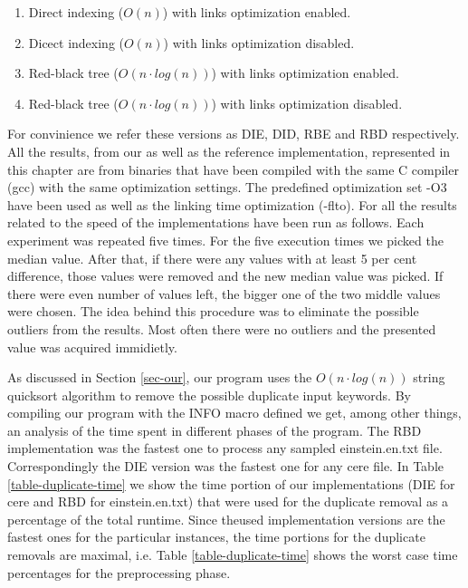 \documentclass[english,twoside,censored,csm,algorithms-track-2020]{HYthesisML}
\theoremstyle{plain}
\theoremstyle{definition}
\begin{document}
\begin{enumerate}
\item Direct indexing ($O(n)$) with links optimization enabled.
\item Dicect indexing ($O(n)$) with links optimization disabled.
\item Red-black tree ($O(n\cdot log(n))$) with links optimization enabled.
\item Red-black tree ($O(n\cdot log(n))$) with links optimization disabled.
\end{enumerate}

For convinience we refer these versions as DIE, DID, RBE and RBD respectively. All the results,
from our as well as the reference implementation,
represented in this chapter are from binaries that have been compiled with the same C
compiler (gcc) with the same optimization settings. The predefined optimization set -O3 have
been used as well as the linking time optimization (-flto). For all the results related to the
speed of the implementations have been run as follows. Each experiment was repeated five times. For
the five execution times we picked the median value. After that, if there were any values with 
at least 5 per cent difference, those values were removed and the new median value was picked.
If there were even number of values left, the bigger one of the two middle values were chosen.
The idea behind this procedure was to eliminate the possible outliers from the results. Most often
there were no outliers and the presented value was acquired immidietly. 

As discussed in Section \ref{sec-our}, our program uses the $O(n\cdot log(n))$ string quicksort
algorithm to remove the possible duplicate input keywords. By compiling our program with the
INFO macro defined we get, among other things, an analysis of the time spent in different phases
of the program. The RBD implementation was the fastest one to process any sampled einstein.en.txt
file. Correspondingly the DIE version was the fastest one for any cere file. In Table
\ref{table-duplicate-time}
we show the time portion of our implementations (DIE for cere and RBD for einstein.en.txt) that were
used for the duplicate removal as a percentage of the total runtime. Since theused  implementation
versions are the fastest ones for the particular instances, the time portions for the duplicate
removals are maximal, i.e. Table \ref{table-duplicate-time} shows the worst case time percentages
for the preprocessing phase.
\end{document}
